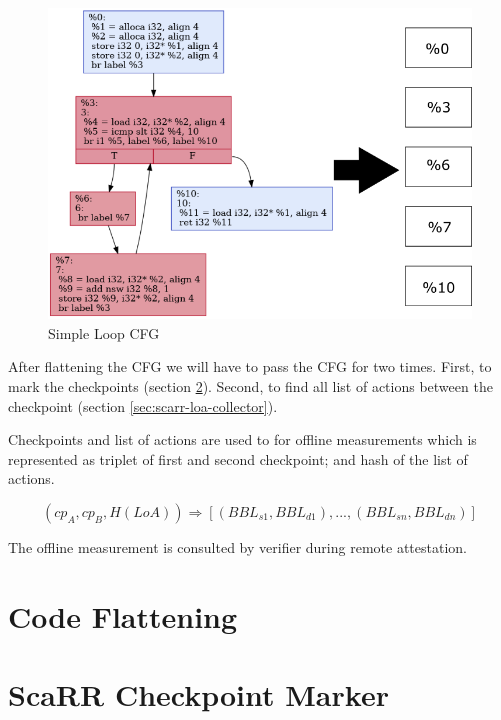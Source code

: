 \begin{figure}[htbp]
\centerline{\includegraphics[scale=.70]{Figures/04/flatten-cfg.png}}
\caption{Simple Loop CFG}
\label{fig:simple-loop-cfg}
\end{figure}

After flattening the CFG we will have to pass the CFG for two times. First, to
mark the checkpoints (section \ref{sec:scarr-checkpoint-marker}). Second, to
find all list of actions between the checkpoint (section
\ref{sec:scarr-loa-collector}).

Checkpoints and list of actions are used to for offline measurements which is
represented as triplet of first and second checkpoint; and hash of the list of
actions.

$$(cp_A, cp_B, H(LoA)) \Rightarrow [(BBL_{s1}, BBL_{d1}), ..., (BBL_{sn},
BBL_{dn})]$$

The offline measurement is consulted by verifier during remote attestation.

\section{Code Flattening}
\label{sec:code-flattening}


\section{ScaRR Checkpoint Marker} 
\label{sec:scarr-checkpoint-marker}

